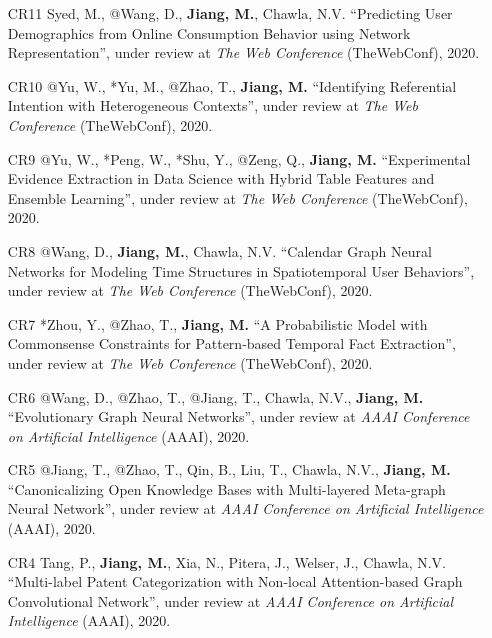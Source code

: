 \documentclass[10pt]{article}
\newenvironment{myindentpar}[1]%
{\begin{list}{}%
         {\setlength{\leftmargin}{#1}}%
         \item[]%
}
{\end{list}}
\newcounter{list}
\begin{document}
\begin{myindentpar}{0.00cm}
\begin{enumerate}[leftmargin=.5cm]

\item[CR11] Syed, M., @Wang, D., \textbf{Jiang, M.}, Chawla, N.V. ``Predicting User Demographics from Online Consumption Behavior using Network Representation'', under review at \textit{The Web Conference} (TheWebConf), 2020.
		
\item[CR10] @Yu, W., *Yu, M., @Zhao, T., \textbf{Jiang, M.} ``Identifying Referential Intention with Heterogeneous Contexts'', under review at \textit{The Web Conference} (TheWebConf), 2020.

\item[CR9] @Yu, W., *Peng, W., *Shu, Y., @Zeng, Q., \textbf{Jiang, M.} ``Experimental Evidence Extraction in Data Science with Hybrid Table Features and Ensemble Learning'', under review at \textit{The Web Conference} (TheWebConf), 2020.

\item[CR8] @Wang, D., \textbf{Jiang, M.}, Chawla, N.V. ``Calendar Graph Neural Networks for Modeling Time Structures in Spatiotemporal User Behaviors'', under review at \textit{The Web Conference} (TheWebConf), 2020.
		
\item[CR7] *Zhou, Y., @Zhao, T., \textbf{Jiang, M.} ``A Probabilistic Model with Commonsense Constraints for Pattern-based Temporal Fact Extraction'', under review at \textit{The Web Conference} (TheWebConf), 2020.

\item[CR6] @Wang, D., @Zhao, T., @Jiang, T., Chawla, N.V., \textbf{Jiang, M.} ``Evolutionary Graph Neural Networks'', under review at \textit{AAAI Conference on Artificial Intelligence} (AAAI), 2020.

\item[CR5] @Jiang, T., @Zhao, T., Qin, B., Liu, T., Chawla, N.V., \textbf{Jiang, M.} ``Canonicalizing Open Knowledge Bases with Multi-layered Meta-graph Neural Network'', under review at \textit{AAAI Conference on Artificial Intelligence} (AAAI), 2020.

\item[CR4] Tang, P., \textbf{Jiang, M.}, Xia, N., Pitera, J., Welser, J., Chawla, N.V. ``Multi-label Patent Categorization with Non-local Attention-based Graph Convolutional Network'', under review at \textit{AAAI Conference on Artificial Intelligence} (AAAI), 2020.
	

\end{enumerate}
\end{myindentpar}
\end{document}

